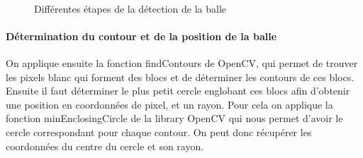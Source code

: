 \begin{figure}
\centering
{}
\\
\caption{Différentes étapes de la détection de la balle}
\label{img_detectionballe}
\end{figure}

\paragraph{Détermination du contour et de la position de la balle\\}

On applique ensuite la fonction findContours de OpenCV, qui permet de trouver les pixels blanc qui forment des blocs et de déterminer les contours de ces blocs. Ensuite il faut déterminer le plus petit cercle englobant ces blocs afin d'obtenir une position en coordonnées de pixel, et un rayon. Pour cela on applique la fonction minEnclosingCircle de la library OpenCV qui nous permet d'avoir le cercle correspondant pour chaque contour. On peut donc récupérer les coordonnées du centre du cercle et son rayon.\\


